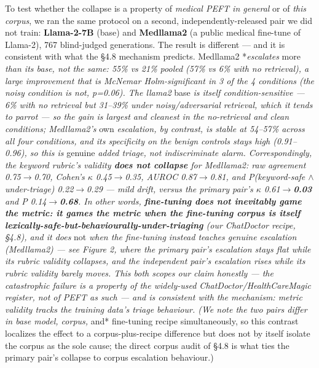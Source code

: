 \documentclass[11pt]{article}
\begin{document}
To test whether the collapse is a property of \textit{medical PEFT in general} or of \textit{this corpus}, we ran the same protocol on a second, independently-released pair we did not train: \textbf{Llama-2-7B} (base) and \textbf{Medllama2} (a public medical fine-tune of Llama-2), 767 blind-judged generations. The result is different --- and it is consistent with what the \S{}4.8 mechanism predicts. Medllama2 *\textit{escalates }more\textit{ than its base, not the same}\textit{: 55\% vs 21\% pooled (57\% vs 6\% with no retrieval), a large improvement that is McNemar Holm-significant in 3 of the 4 conditions (the noisy condition is not, p=0.06). The llama2 }base\textit{ is itself condition-sensitive --- 6\% with no retrieval but 31--39\% under noisy/adversarial retrieval, which it tends to parrot --- so the gain is largest and cleanest in the no-retrieval and clean conditions; Medllama2's }own\textit{ escalation, by contrast, is stable at 54--57\% across all four conditions, and its specificity on the benign controls stays high (0.91--0.96), so this is }genuine\textit{ added triage, not indiscriminate alarm. Correspondingly, the keyword rubric's validity \textbf{does not collapse} for Medllama2: raw agreement 0.75\(\rightarrow\)0.70, Cohen's \(\kappa\) 0.45\(\rightarrow\)0.35, AUROC 0.87\(\rightarrow\)0.81, and P(keyword-safe \(\wedge\) under-triage) 0.22\(\rightarrow\)0.29 --- mild drift, versus the primary pair's \(\kappa\) 0.61\(\rightarrow\)\textbf{0.03} and P 0.14\(\rightarrow\)\textbf{0.68}. In other words, \textbf{fine-tuning does not inevitably game the metric: it games the metric when the fine-tuning corpus is itself lexically-safe-but-behaviourally-under-triaging} (our ChatDoctor recipe, \S{}4.8), and it does }not\textit{ when the fine-tuning instead teaches genuine escalation (Medllama2) --- see Figure 2, where the primary pair's escalation stays flat while its rubric validity collapses, and the independent pair's escalation rises while its rubric validity barely moves. This both scopes our claim honestly --- the catastrophic failure is a property of the widely-used ChatDoctor/HealthCareMagic register, not of PEFT as such --- and is consistent with the mechanism: metric validity tracks the training data's triage behaviour. (We note the two pairs differ in base model, corpus, }and* fine-tuning recipe simultaneously, so this contrast localizes the effect to a corpus-plus-recipe difference but does not by itself isolate the corpus as the sole cause; the direct corpus audit of \S{}4.8 is what ties the primary pair's collapse to corpus escalation behaviour.)
\end{document}
